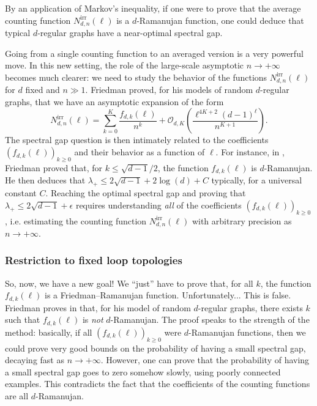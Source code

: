 \documentclass[12pt,twoside]{article}
\theoremstyle{theorem}
\theoremstyle{remark}
\theoremstyle{definition}
\theoremstyle{example}
\newcommand{\1}[1]{\mathds{1}_{#1}}
\renewcommand{\O}[2][ ]{\mathcal{O}_{#1} \left( #2 \right)}
\newcommand{\ord}{K}
\begin{document}
By an application of Markov's inequality, if one were to prove that the average counting function
$N^{\mathrm{irr}}_{d,n}(\ell)$ is a $d$-Ramanujan function, one could deduce that typical
$d$-regular graphs have a near-optimal spectral gap.

Going from a single counting function to an averaged version is a very powerful move. In this new
setting, the role of the large-scale asymptotic $n \rightarrow + \infty$ becomes much clearer: we
need to study the behavior of the functions $N^{\mathrm{irr}}_{d,n}(\ell)$ for $d$ fixed and
$n \gg 1$. Friedman proved, for his models of random $d$-regular graphs, that we have an asymptotic
expansion of the form
\begin{equation*}
  N^{\mathrm{irr}}_{d,n}(\ell)
  = \sum_{k=0}^{\ord} \frac{f_{d,k}(\ell)}{n^k} + \O[d,K]{\frac{\ell^{4K+2}(d-1)^{\ell}}{n^{K+1}}}.
\end{equation*}
The spectral gap question is then intimately related to the coefficients
$(f_{d,k}(\ell))_{k \geq 0}$ and their behavior as a function of $\ell$. For instance, in
\cite{friedman1991}, Friedman proved that, for $k \leq \sqrt{d-1}/2$, the function $f_{d,k}(\ell)$
is $d$-Ramanujan. He then deduces that $\lambda_+ \leq 2 \sqrt{d-1}+2\log(d)+C$ typically, for a
universal constant $C$.
Reaching the optimal spectral gap and proving that $\lambda_+\leq 2 \sqrt{d-1} + \epsilon$ requires
understanding \emph{all} of the coefficients $(f_{d,k}(\ell))_{k \geq 0}$, i.e. estimating the
counting function $N_{d,n}^{\mathrm{irr}}(\ell)$ with arbitrary precision as $n \rightarrow + \infty$.


\subsubsection{Restriction to fixed loop topologies}
\label{sec:restr-fixed-loop}

So, now, we have a new goal! We ``just'' have to prove that, for all $k$, the function
$f_{d,k}(\ell)$ is a Friedman--Ramanujan function. Unfortunately... This is false. Friedman proves
in \cite[Theorem 2.12]{friedman2003} that, for his model of random $d$-regular graphs, there exists
$k$ such that $f_{d,k}(\ell)$ is \emph{not}
$d$-Ramanujan. %
The proof speaks to the strength of the method: basically, if all $(f_{d,k}(\ell))_{k \geq 0}$ were
$d$-Ramanujan functions, then we could prove very good bounds on the probability of having a small
spectral gap, decaying fast as $n \rightarrow + \infty$. However, one can prove that the probability
of having a small spectral gap goes to zero somehow slowly, using poorly connected examples. This
contradicts the fact that the coefficients of the counting functions are all $d$-Ramanujan.
\end{document}
